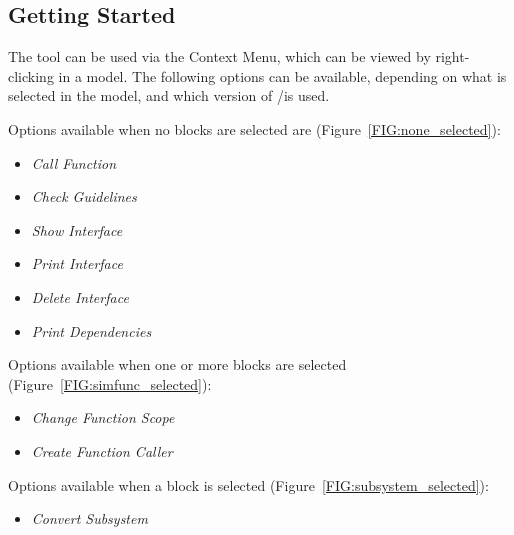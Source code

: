 \documentclass{article}
\newcommand{\menu}[1]{%
	\ifstrequal{#1}{1}{Call Function}{}%
  \ifstrequal{#1}{2}{Create Function Caller}{}%
	\ifstrequal{#1}{3}{Change Function Scope}{}%
	\ifstrequal{#1}{4}{Check Guidelines}{}%
	\ifstrequal{#1}{5}{Show Interface}{}%
	\ifstrequal{#1}{6}{Print Interface}{}%
	\ifstrequal{#1}{7}{Print Dependencies}{}%
	\ifstrequal{#1}{8}{Delete Interface}{}%
	\ifstrequal{#1}{9}{Convert Subsystem}{}%
}
\begin{document}
\subsection{Getting Started}
The tool can be used via the \Simulink Context Menu, which can be viewed by right-clicking in a model. The following options can be available, depending on what is selected in the model, and which version of \Matlab/\Simulink is used.

\noindent
Options available when no blocks are selected are (Figure~\ref{FIG:none_selected}):
\begin{itemize}
	\item \emph{\menu{1}} %
	\item \emph{\menu{4}}
	\item \emph{\menu{5}} %
	\item \emph{\menu{6}} %
	\item \emph{\menu{8}} %
	\item \emph{\menu{7}} 
\end{itemize}

\noindent
Options available when one or more \simfunc blocks are selected (Figure~\ref{FIG:simfunc_selected}):
\begin{itemize}
	\item \emph{\menu{3}} %
	\item \emph{\menu{2}} %
\end{itemize}

\noindent
Options available when a \subsystem block is selected (Figure~\ref{FIG:subsystem_selected}):
\begin{itemize}
	\item \emph{\menu{9}} %
\end{itemize}
\end{document}
